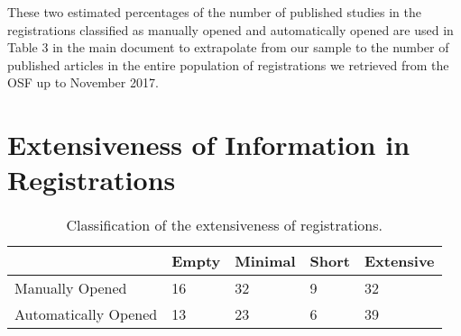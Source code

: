 \documentclass[
  ,jou, a4paper,floatsintext]{apa6}
\begin{document}
These two estimated percentages of the number of published studies in the registrations classified as manually opened and automatically opened are used in Table 3 in the main document to extrapolate from our sample to the number of published articles in the entire population of registrations we retrieved from the OSF up to November 2017.

\hypertarget{extensiveness-of-information-in-registrations}{%
\section{Extensiveness of Information in Registrations}\label{extensiveness-of-information-in-registrations}}

\begin{table*}[tbp]

\begin{center}
\begin{threeparttable}

\caption{\label{tab:table-quality}Classification of the extensiveness of registrations.}

\begin{tabular}{lllll}
\toprule
 & \multicolumn{1}{c}{Empty} & \multicolumn{1}{c}{Minimal} & \multicolumn{1}{c}{Short} & \multicolumn{1}{c}{Extensive}\\
\midrule
Manually Opened & 16 & 32 & 9 & 32\\
Automatically Opened & 13 & 23 & 6 & 39\\
\bottomrule
\end{tabular}

\end{threeparttable}
\end{center}

\end{table*}
\end{document}
